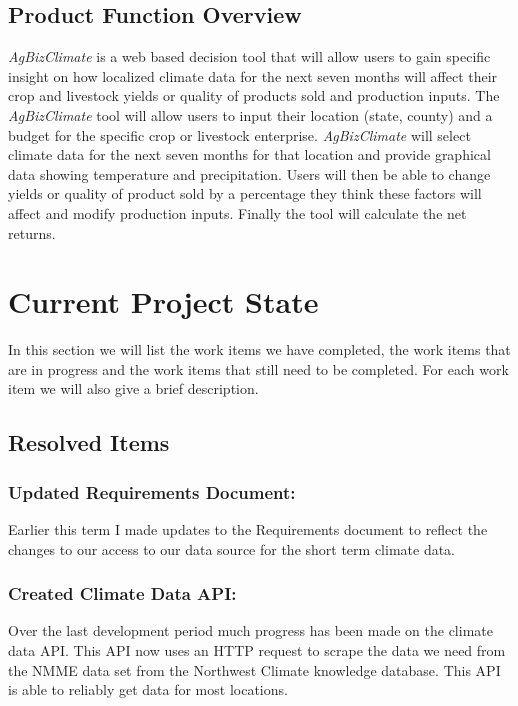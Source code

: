 \documentclass[onecolumn, draftclsnofoot,10pt, compsoc]{article}
\begin{document}
		\subsection{Product Function Overview}
		    \textit{AgBizClimate} is a web based decision tool that will allow users to gain specific insight on how localized climate data for the next seven months will affect their crop and livestock yields or quality of products sold and production inputs. The \textit{AgBizClimate} tool will allow users to input their location (state, county) and a budget for the specific crop or livestock enterprise. \textit{AgBizClimate} will select climate data for the next seven months for that location and provide graphical data showing temperature and precipitation. Users will then be able to change yields or quality of product sold by a percentage they think these factors will affect and modify production inputs. Finally the tool will calculate the net returns.\\

\section{Current Project State}
In this section we will list the work items we have completed, the work items that are in progress and the work items that still need to be completed. For each work item we will also give a brief description.\\

	\subsection{Resolved Items}
		\subsubsection{Updated Requirements Document:}
		Earlier this term I made updates to the Requirements document to reflect the changes to our access to our data source for the short term climate data.\\
		
		\subsubsection{Created Climate Data API:}
		Over the last development period much progress has been made on the climate data API. This API now uses an HTTP request to scrape the data we need from the NMME data set from the Northwest Climate knowledge database. This API is able to reliably get data for most locations.\\
		
\end{document}
